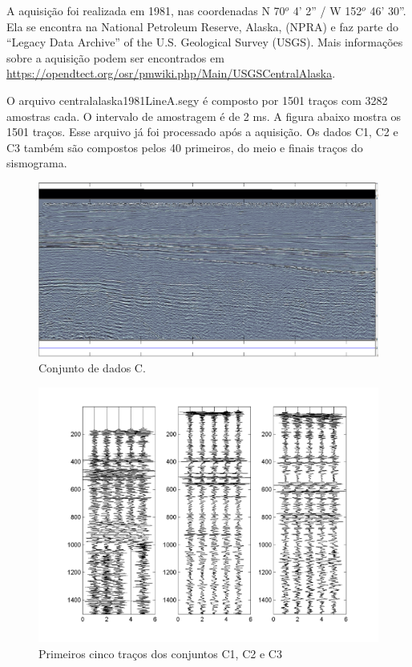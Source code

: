 A aquisição foi realizada em 1981, nas coordenadas N 70$^o$ 4' 2'' / W 152$^o$
46' 30''. Ela se encontra na National Petroleum Reserve, Alaska, (NPRA) e faz
parte do  “Legacy Data Archive” of the U.S. Geological Survey (USGS). Mais informações
sobre a aquisição podem ser encontrados em
\url{https://opendtect.org/osr/pmwiki.php/Main/USGSCentralAlaska}.

O arquivo centralalaska1981LineA.segy é composto por 1501 traços com 3282
amostras cada. O intervalo de amostragem é de 2 ms. A figura abaixo mostra os
1501 traços. Esse arquivo já foi processado após a aquisição. Os dados C1, C2 e
C3 também são compostos pelos 40 primeiros, do meio e finais traços do
sismograma.

\begin{figure}[ht]
\centering
\includegraphics[scale=1]{fig/over_img_c.png}
\caption{Conjunto de dados C.}
\label{Figura:conjuntodedadosc}
\end{figure}

\begin{figure}[!h]
\centering
  \includegraphics[scale=1.01]{fig/fig_C1.png}
  \caption{Primeiros cinco traços dos conjuntos C1, C2 e C3}
  \label{Figura:c1c2c3}
\end{figure}

